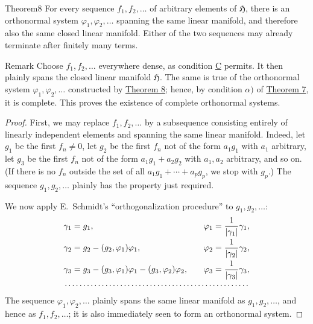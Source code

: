 ﻿\documentclass[paper=b5,fontsize=13pt,bookmarkpackage=false,twoside]{scrartcl}
\begin{document}
\begin{namedstatement}{Theorem}{8}\label{thm:8}
For every sequence $f_1,f_2,\ldots$ of arbitrary elements of $\mathfrak H$, there is an orthonormal system $\varphi_1,\varphi_2,\ldots$ spanning the same linear manifold, and therefore also the same closed linear manifold. Either of the two sequences may already terminate after finitely many terms.
\end{namedstatement}

\begin{namedstatement}{Remark}{}\label{rem:after-thm8}
Choose $f_1,f_2,\ldots$ everywhere dense, as condition \hyperref[axiom:C]{C} permits. It then plainly spans the closed linear manifold $\mathfrak H$. The same is true of the orthonormal system $\varphi_1,\varphi_2,\ldots$ constructed by \hyperref[thm:8]{Theorem 8}; hence, by condition $\alpha)$ of \hyperref[thm:7]{Theorem 7}, it is complete. This proves the existence of complete orthonormal systems.
\end{namedstatement}

\begin{proof}
First, we may replace $f_1,f_2,\ldots$ by a subsequence consisting entirely of linearly independent elements and spanning the same linear manifold. Indeed, let $g_1$ be the first $f_n\ne0$, let $g_2$ be the first $f_n$ not of the form $a_1g_1$ with $a_1$ arbitrary, let $g_3$ be the first $f_n$ not of the form $a_1g_1+a_2g_2$ with $a_1,a_2$ arbitrary, and so on. (If there is no $f_n$ outside the set of all $a_1g_1+\cdots+a_pg_p$, we stop with $g_p$.) The sequence $g_1,g_2,\ldots$ plainly has the property just required.

We now apply E.~Schmidt's ``orthogonalization procedure'' to $g_1,g_2,\ldots$:
\[
\begin{array}{lll}
\gamma_1=g_1,
&&
\displaystyle\varphi_1=\frac{1}{|\gamma_1|}\gamma_1,
\\[0.9em]
\gamma_2=g_2-(g_2,\varphi_1)\varphi_1,
&&
\displaystyle\varphi_2=\frac{1}{|\gamma_2|}\gamma_2,
\\[0.9em]
\gamma_3=g_3-(g_3,\varphi_1)\varphi_1-(g_3,\varphi_2)\varphi_2,
&&
\displaystyle\varphi_3=\frac{1}{|\gamma_3|}\gamma_3,
\\[-0.1em]
\multicolumn{3}{c}{\dotfill}
\end{array}
\]
The sequence $\varphi_1,\varphi_2,\ldots$ plainly spans the same linear manifold as $g_1,g_2,\ldots$, and hence as $f_1,f_2,\ldots$; it is also immediately seen to form an orthonormal system.
\end{proof}
\end{document}
